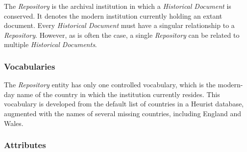 The \textit{Repository} is the archival institution in which a \textit{Historical Document} is conserved. It denotes the modern institution currently holding an extant document. Every \textit{Historical Document} must have a singular relationship to a \textit{Repository}. However, as is often the case, a single \textit{Repository} can be related to multiple \textit{Historical Documents}.

\subsubsection{Vocabularies}

The \textit{Repository} entity has only one controlled vocabulary, which is the modern-day name of the country in which the institution currently resides. This vocabulary is developed from the default list of countries in a Heurist database, augmented with the names of several missing countries, including England and Wales.

\subsubsection{Attributes}


